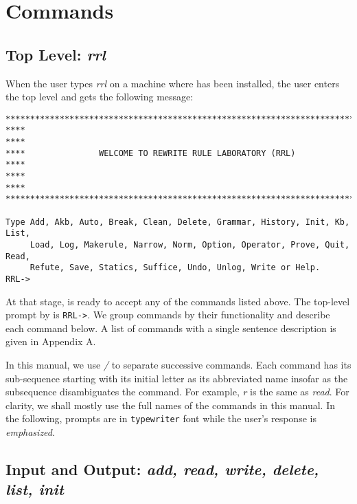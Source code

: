 \chapter{Commands}

\section{Top Level: {\em rrl}}
When the user types {\em rrl} on a machine where \RRL has been
installed, the user enters the top level and gets the following
message:

\begin{verbatim}
****************************************************************************
****                                                                    ****
****               WELCOME TO REWRITE RULE LABORATORY (RRL)             ****
****                                                                    ****
****************************************************************************

Type Add, Akb, Auto, Break, Clean, Delete, Grammar, History, Init, Kb, List,
     Load, Log, Makerule, Narrow, Norm, Option, Operator, Prove, Quit, Read,
     Refute, Save, Statics, Suffice, Undo, Unlog, Write or Help.
RRL-> 
\end{verbatim}  
At that stage, \RRL is ready to accept any of the commands listed
above.  The top-level prompt by \RRL is {\tt RRL->}.  We group
commands by their functionality and describe each command below. A
list of commands with a single sentence description is given in
Appendix A.
  
In this manual, we use {\em /} to separate successive commands. Each
command has its sub-sequence starting with its initial letter as its
abbreviated name insofar as the subsequence disambiguates the command.
For example, {\em r} is the same as {\em read}.  For clarity, we shall
mostly use the full names of the commands in this manual.
In the following, \RRL prompts are in {\tt typewriter} font while the
user's response is {\em emphasized}.

\section{Input and Output: {\em add, read, write, delete, list, init}}

